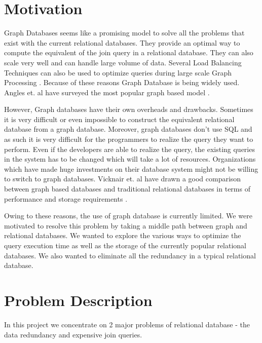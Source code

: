 \documentclass[12pt, oneside]{book}
\begin{document}
\section{Motivation}
Graph Databases seems like a promising model to solve all the problems that exist with the current relational databases. They provide an optimal way to compute the equivalent of the join query in a relational database. They can also scale very well and can handle large volume of data. Several Load Balancing Techniques can also be used to optimize queries during large scale Graph Processing \cite{load_balancing}. Because of these reasons Graph Database is being widely used. Angles et. al have surveyed the most popular graph based model \cite{graph_database_survey}. \\ \par
However, Graph databases have their own overheads and drawbacks. Sometimes it is very difficult or even impossible to construct the equivalent relational database from a graph database. Moreover, graph databases don't use SQL and as such it is very difficult for the programmers to realize the query they want to perform. Even if the developers are able to realize the query, the existing queries in the system has to be changed which will take a lot of resources. Organizations which have made huge investments on their database system might not be willing to switch to graph databases. Vicknair et. al have drawn a good comparison between graph based databases and traditional relational databases in terms of performance and storage requirements \cite{graph_relational_comparison}. \\ \par
Owing to these reasons, the use of graph database is currently limited. We were motivated to resolve this problem by taking a middle path between graph and relational databases. We wanted to explore the various ways to optimize the query execution time as well as the storage of the currently popular relational databases. We also wanted to eliminate all the redundancy in a typical relational database.

\section{Problem Description}
In this project we concentrate on 2 major problems of relational database - the data redundancy and expensive join queries.
\end{document}
